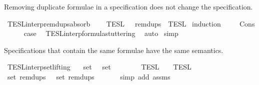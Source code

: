 \begin{isabellebody}
\begin{isamarkuptext}
Removing duplicate formulae in a specification does not change the specification.%
\end{isamarkuptext}\isamarkuptrue%
\isamarkupfalse%
\ TESL{\isacharunderscore}interp{\isacharunderscore}remdups{\isacharunderscore}absorb{\isacharcolon}\isanewline
\ \ {\isacartoucheopen}{\isasymlbrakk}{\isasymlbrakk}\ {\isasymPhi}\ {\isasymrbrakk}{\isasymrbrakk}\isactrlsub T\isactrlsub E\isactrlsub S\isactrlsub L\ {\isacharequal}\ {\isasymlbrakk}{\isasymlbrakk}\ remdups\ {\isasymPhi}\ {\isasymrbrakk}{\isasymrbrakk}\isactrlsub T\isactrlsub E\isactrlsub S\isactrlsub L{\isacartoucheclose}\isanewline
%
\isadelimproof
%
\endisadelimproof
%
\isatagproof
{}\isamarkupfalse%
\ {\isacharparenleft}induction\ {\isasymPhi}{\isacharparenright}\isanewline
\ \ \isamarkupfalse%
\ Cons\isanewline
\ \ \ \ \isamarkupfalse%
\ {\isacharquery}case\ \isamarkupfalse%
\ TESL{\isacharunderscore}interp{\isacharunderscore}formula{\isacharunderscore}stuttering\ \isamarkupfalse%
\ auto\isanewline
{}\isamarkupfalse%
\ simp%
\endisatagproof
{\isafoldproof}%
%
\isadelimproof
%
\endisadelimproof
%
\begin{isamarkuptext}%
Specifications that contain the same formulae have the same semantics.%
\end{isamarkuptext}\isamarkuptrue%
\isamarkupfalse%
\ TESL{\isacharunderscore}interp{\isacharunderscore}set{\isacharunderscore}lifting{\isacharcolon}\isanewline
\ \ \ {\isacartoucheopen}set\ {\isasymPhi}\ {\isacharequal}\ set\ {\isasymPhi}{\isacharprime}{\isacartoucheclose}\isanewline
\ \ \ \ \ {\isacartoucheopen}{\isasymlbrakk}{\isasymlbrakk}\ {\isasymPhi}\ {\isasymrbrakk}{\isasymrbrakk}\isactrlsub T\isactrlsub E\isactrlsub S\isactrlsub L\ {\isacharequal}\ {\isasymlbrakk}{\isasymlbrakk}\ {\isasymPhi}{\isacharprime}\ {\isasymrbrakk}{\isasymrbrakk}\isactrlsub T\isactrlsub E\isactrlsub S\isactrlsub L{\isacartoucheclose}\isanewline
%
\isadelimproof
%
\endisadelimproof
%
\isatagproof
{}\isamarkupfalse%
\ {\isacharminus}\ \ \ \ \ \isanewline
\ \ \isamarkupfalse%
\ {\isacartoucheopen}set\ {\isacharparenleft}remdups\ {\isasymPhi}{\isacharparenright}\ {\isacharequal}\ set\ {\isacharparenleft}remdups\ {\isasymPhi}{\isacharprime}{\isacharparenright}{\isacartoucheclose}\isanewline
\ \ \ \ \isamarkupfalse%
\ {\isacharparenleft}simp\ add{\isacharcolon}\ assms{\isacharparenright}\isanewline
\ \ \isamarkupfalse%

\end{isabellebody}
